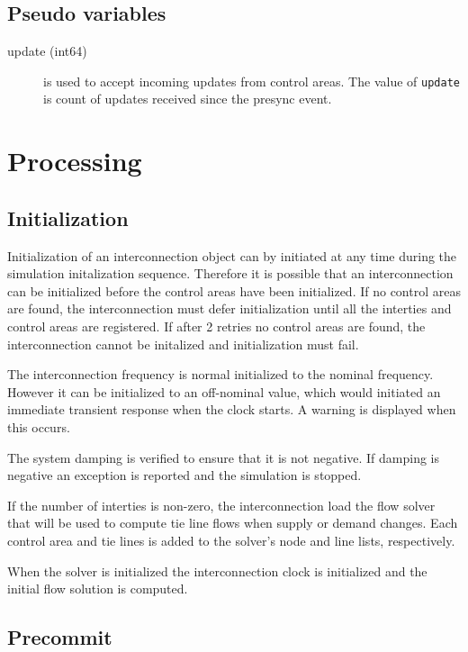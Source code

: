 \subsection{Pseudo variables}

\begin{description}
\item[update (int64)] is used to accept incoming updates from control areas. The value of \texttt{update} is count of updates received since the presync event. 
\end{description}

\section{Processing}

\subsection{Initialization}

Initialization of an interconnection object can by initiated at any time during the simulation initalization sequence.  Therefore it is possible that an interconnection can be initialized before the control areas have been initialized.  If no control areas are found, the interconnection must defer initialization until all the interties and control areas are registered.  If after 2 retries no control areas are found, the interconnection cannot be initalized and initialization must fail.

The interconnection frequency is normal initialized to the nominal frequency.  However it can be initialized to an off-nominal value, which would initiated an immediate transient response when the clock starts.  A warning is displayed when this occurs.

The system damping is verified to ensure that it is not negative.  If damping is negative an exception is reported and the simulation is stopped.

If the number of interties is non-zero, the interconnection load the flow solver that will be used to compute tie line flows when supply or demand changes.  Each control area and tie lines is added to the solver's node and line lists, respectively.

When the solver is initialized the interconnection clock is initialized and the initial flow solution is computed.

\subsection{Precommit}

